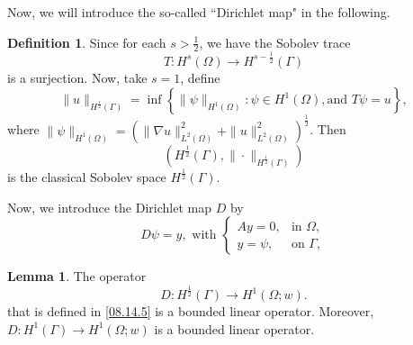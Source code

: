 \documentclass[preprint,12pt]{elsarticle}
\theoremstyle{definition}   %
\newtheorem{lemma}[theorem]{Lemma}
\newtheorem{definition}[theorem]{Definition}
\numberwithin{equation}{section}
\def\ra{\rightarrow}
\def\Om{\Omega}
\def\Ga{\Gamma}
\def\f{\frac}
\begin{document}
Now, we will introduce the so-called ``Dirichlet map" in the following. 

\begin{definition}\label{08.20.D1}
	Since for each $s>\f{1}{2}$, we have the Sobolev trace 
	\begin{equation*}
		T: H^s(\Om)\ra H^{s-\f{1}{2}}(\Ga)
	\end{equation*}
	is a surjection. Now, take $s=1$, define 
	\begin{equation*}
		\|u\|_{H^\f{1}{2}(\Ga)}=\inf\left\{\|\psi\|_{H^1(\Om)}\colon \psi\in H^1(\Om), \mbox{and }  T\psi=u\right\}, 
	\end{equation*}
	where $\|\psi\|_{H^1(\Om)}=(\|\nabla u\|_{L^2(\Om)}^2+\|u\|_{L^2(\Om)}^2)^\f{1}{2}$. Then 
	\begin{equation*}
		(H^\f{1}{2}(\Ga), \|\cdot\|_{H^\f{1}{2}(\Ga)})
	\end{equation*}
	is the classical Sobolev space $H^\f{1}{2}(\Ga)$. 
\end{definition}





Now, we introduce the Dirichlet map $D$ by 
\begin{equation}\label{08.14.5}
	D\psi=y, \mbox{ with } 
	\begin{cases}
		A y=0, &\mbox{in }\Om,\\
		y=\psi, &\mbox{on }\Ga, 
	\end{cases}
\end{equation}

\begin{lemma}\label{08.20.L1}
	The operator 
	\begin{equation*}
		D: H^\f{1}{2}(\Ga)\ra H^1(\Om;w).
	\end{equation*}
	that is defined in \eqref{08.14.5} is a bounded linear operator.
	Moreover, $D: H^1(\Ga)\ra H^1(\Om;w)$ is a bounded linear operator. 
\end{lemma}
\end{document}

